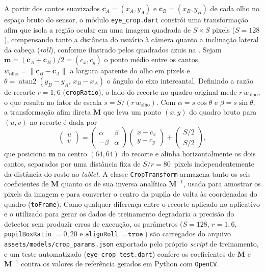 A partir dos cantos suavizados $\mathbf{c}_A = (x_A, y_A)$ e $\mathbf{c}_B = (x_B, y_B)$ de cada olho no espaço bruto do sensor, o módulo \texttt{eye\_crop.dart} constrói uma transformação afim que isola a região ocular em uma imagem quadrada de $S \times S$ pixels ($S = 128$), compensando tanto a distância do usuário à câmera quanto a inclinação lateral da cabeça (\textit{roll}), conforme ilustrado pelos quadrados azuis na . Sejam $\mathbf{m} = (\mathbf{c}_A + \mathbf{c}_B)/2 = (c_x, c_y)$ o ponto médio entre os cantos, $w_{\text{olho}} = \lVert \mathbf{c}_B - \mathbf{c}_A \rVert$ a largura aparente do olho em pixels e $\theta = \operatorname{atan2}(y_B - y_A,\, x_B - x_A)$ o ângulo do eixo intercantal. Definindo a razão de recorte $r = 1{,}6$ (\texttt{cropRatio}), o lado do recorte no quadro original mede $r\,w_{\text{olho}}$, o que resulta no fator de escala $s = S / (r\,w_{\text{olho}})$. Com $\alpha = s\cos\theta$ e $\beta = s\sin\theta$, a transformação afim direta $\mathbf{M}$ que leva um ponto $(x, y)$ do quadro bruto para $(u, v)$ no recorte é dada por
\begin{equation}
    \begin{pmatrix} u \\ v \end{pmatrix} =
    \begin{pmatrix} \alpha & \beta \\ -\beta & \alpha \end{pmatrix}
    \begin{pmatrix} x - c_x \\ y - c_y \end{pmatrix} +
    \begin{pmatrix} S/2 \\ S/2 \end{pmatrix},
    \label{eq:afim_recorte}
\end{equation}
que posiciona $\mathbf{m}$ no centro $(64, 64)$ do recorte e alinha horizontalmente os dois cantos, separados por uma distância fixa de $S / r = 80$~pixels independentemente da distância do rosto ao \textit{tablet}. A classe \texttt{CropTransform} armazena tanto os seis coeficientes de $\mathbf{M}$ quanto os de sua inversa analítica $\mathbf{M}^{-1}$, usada para amostrar os pixels da imagem e para converter o centro da pupila de volta às coordenadas do quadro (\texttt{toFrame}). Como qualquer diferença entre o recorte aplicado no aplicativo e o utilizado para gerar os dados de treinamento degradaria a precisão do detector sem produzir erros de execução, os parâmetros ($S = 128$, $r = 1{,}6$, \texttt{pupilBoxRatio} $= 0{,}20$ e \texttt{alignRoll} $= \texttt{true}$) são carregados do arquivo \texttt{assets/models/crop\_params.json} exportado pelo próprio \textit{script} de treinamento, e um teste automatizado (\texttt{eye\_crop\_test.dart}) confere os coeficientes de $\mathbf{M}$ e $\mathbf{M}^{-1}$ contra os valores de referência gerados em Python com \texttt{OpenCV}.

